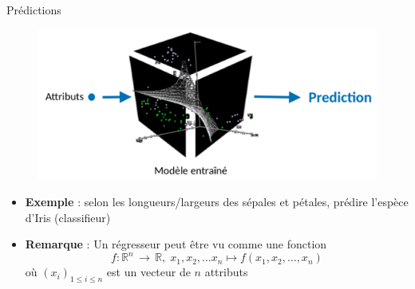 \documentclass[compress]{beamer}
\begin{document}
\begin{frame}{Prédictions}
  \begin{figure}
  \centering
  \includegraphics[width=0.7\linewidth]{resources/resume2}
  \end{figure}
  \vspace{-.05\linewidth}
  \begin{itemize}
    \item \textbf{\color{fibeamer@orange}Exemple} : selon les longueurs/largeurs des sépales et pétales, prédire l'espèce d'Iris (classifieur)
    \item \textbf{\color{fibeamer@orange}Remarque} : Un régresseur peut être vu comme une fonction
    \[ f: \mathbb{R}^n \, \rightarrow \, \mathbb{R}, \; x_1, x_2, \dots x_n \mapsto f(x_1, x_2, \dots, x_n)\]
    où $(x_i)_{1\leq i \leq n}$ est un vecteur de $n$ attributs
  \end{itemize}
\end{frame}
\end{document}
